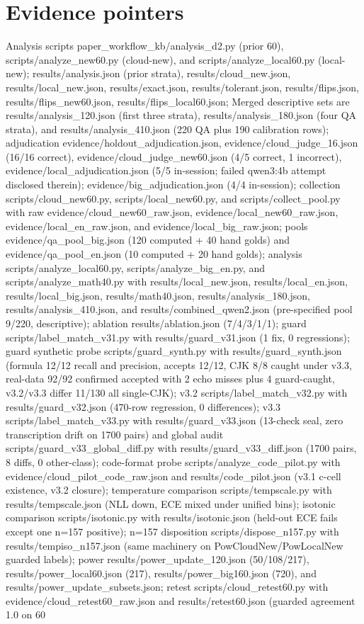 \documentclass[10pt]{article} %
\begin{document}
\section{Evidence pointers}
Analysis scripts paper\_workflow\_kb/analysis\_d2.py (prior 60), scripts/analyze\_new60.py (cloud-new), and scripts/analyze\_local60.py (local-new); results/analysis.json (prior strata), results/cloud\_new.json, results/local\_new.json, results/exact.json, results/tolerant.json, results/flips.json, results/flips\_new60.json, results/flips\_local60.json;
Merged descriptive sets are results/analysis\_120.json (first three strata), results/analysis\_180.json (four QA strata), and results/analysis\_410.json (220 QA plus 190 calibration rows);
adjudication evidence/holdout\_adjudication.json, evidence/cloud\_judge\_16.json (16/16 correct), evidence/cloud\_judge\_new60.json (4/5 correct, 1 incorrect), evidence/local\_adjudication.json (5/5 in-session; failed qwen3:4b attempt disclosed therein); evidence/big\_adjudication.json (4/4 in-session); collection scripts/cloud\_new60.py, scripts/local\_new60.py, and scripts/collect\_pool.py with raw evidence/cloud\_new60\_raw.json, evidence/local\_new60\_raw.json, evidence/local\_en\_raw.json, and evidence/local\_big\_raw.json; pools evidence/qa\_pool\_big.json (120 computed + 40 hand golds) and evidence/qa\_pool\_en.json (10 computed + 20 hand golds); analysis scripts/analyze\_local60.py, scripts/analyze\_big\_en.py, and scripts/analyze\_math40.py with results/local\_new.json, results/local\_en.json, results/local\_big.json, results/math40.json, results/analysis\_180.json, results/analysis\_410.json, and results/combined\_qwen2.json (pre-specified pool 9/220, descriptive); ablation results/ablation.json (7/4/3/1/1); guard scripts/label\_match\_v31.py with results/guard\_v31.json (1 fix, 0 regressions); guard synthetic probe scripts/guard\_synth.py with results/guard\_synth.json (formula 12/12 recall and precision, accepts 12/12, CJK 8/8 caught under v3.3, real-data 92/92 confirmed accepted with 2 echo misses plus 4 guard-caught, v3.2/v3.3 differ 11/130 all single-CJK); v3.2 scripts/label\_match\_v32.py with results/guard\_v32.json (470-row regression, 0 differences); v3.3 scripts/label\_match\_v33.py with results/guard\_v33.json (13-check seal, zero transcription drift on 1700 pairs) and global audit scripts/guard\_v33\_global\_diff.py with results/guard\_v33\_diff.json (1700 pairs, 8 diffs, 0 other-class); code-format probe scripts/analyze\_code\_pilot.py with evidence/cloud\_pilot\_code\_raw.json and results/code\_pilot.json (v3.1 c-cell existence, v3.2 closure); temperature comparison scripts/tempscale.py with results/tempscale.json (NLL down, ECE mixed under unified bins); isotonic comparison scripts/isotonic.py with results/isotonic.json (held-out ECE fails except one n=157 positive); n=157 disposition scripts/dispose\_n157.py with results/tempiso\_n157.json (same machinery on PowCloudNew/PowLocalNew guarded labels); power results/power\_update\_120.json (50/108/217), results/power\_local60.json (217), results/power\_big160.json (720), and results/power\_update\_subsets.json; retest scripts/cloud\_retest60.py with evidence/cloud\_retest60\_raw.json and results/retest60.json (guarded agreement 1.0 on 60 
\end{document}
